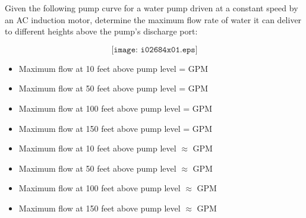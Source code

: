 

Given the following pump curve for a water pump driven at a constant speed by an AC induction motor, determine the maximum flow rate of water it can deliver to different heights above the pump's discharge port:

$$\texttt{[image: i02684x01.eps]}$$

\begin{itemize}
\item{} Maximum flow at 10 feet above pump level = \underbar{\hskip 50pt} GPM
\vskip 5pt
\item{} Maximum flow at 50 feet above pump level = \underbar{\hskip 50pt} GPM
\vskip 5pt
\item{} Maximum flow at 100 feet above pump level = \underbar{\hskip 50pt} GPM
\vskip 5pt
\item{} Maximum flow at 150 feet above pump level = \underbar{\hskip 50pt} GPM
\end{itemize}







\begin{itemize}
\item{} Maximum flow at 10 feet above pump level $\approx$  GPM
\vskip 5pt
\item{} Maximum flow at 50 feet above pump level $\approx$  GPM
\vskip 5pt
\item{} Maximum flow at 100 feet above pump level $\approx$  GPM
\vskip 5pt
\item{} Maximum flow at 150 feet above pump level $\approx$  GPM
\end{itemize}












